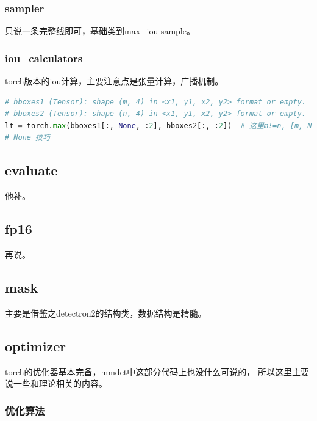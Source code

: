 \documentclass[UTF8]{ctexart}
\begin{document}
\subsubsection{sampler}
只说一条完整线即可，基础类到max\_iou  sample。
\subsubsection{iou\_calculators}
torch版本的iou计算，主要注意点是张量计算，广播机制。

\lstset{style=mystyle}
\begin{lstlisting}[language=Python]
# bboxes1 (Tensor): shape (m, 4) in <x1, y1, x2, y2> format or empty.
# bboxes2 (Tensor): shape (n, 4) in <x1, y1, x2, y2> format or empty.
lt = torch.max(bboxes1[:, None, :2], bboxes2[:, :2])  # 这里m!=n, [m, None, 2] + [n, 2] --> [m, n, 2] 
# None 技巧
\end{lstlisting}

\subsection{evaluate}
他补。
\subsection{fp16}
再说。
\subsection{mask}
主要是借鉴之detectron2的结构类，数据结构是精髓。
\subsection{optimizer}
torch的优化器基本完备，mmdet中这部分代码上也没什么可说的，
所以这里主要说一些和理论相关的内容。

\subsubsection{优化算法}
\end{document}
